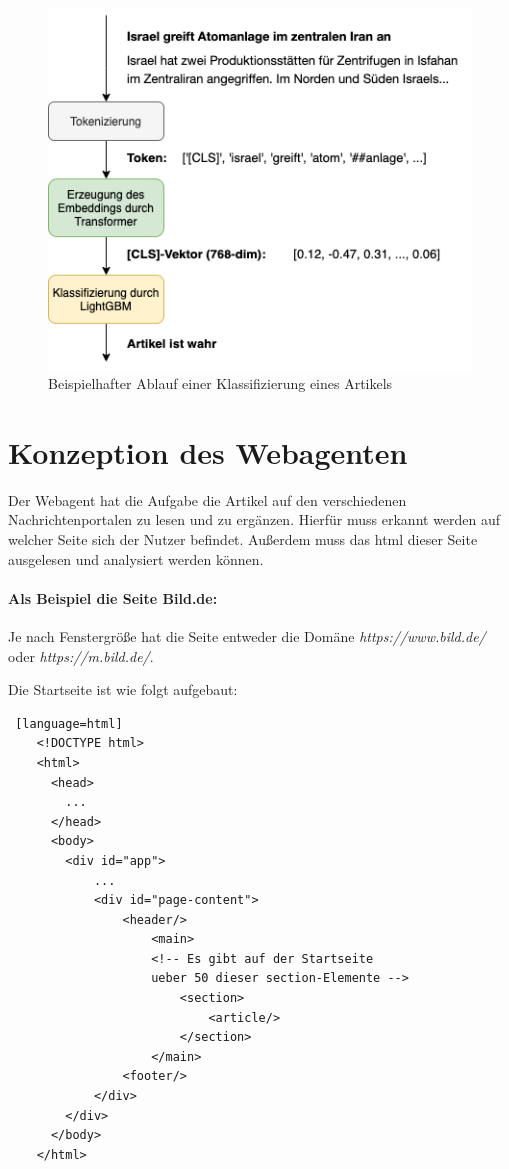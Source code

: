 \begin{figure}[htbp]
    \begin{center}
        \includegraphics[scale=0.6]{diagrams/beispielablauf_gesamt.png}
        \caption{\label{fig:beispielablauf_gesamt} Beispielhafter Ablauf einer Klassifizierung eines Artikels}
    \end{center}
\end{figure}

\section{Konzeption des Webagenten} \label{sec:06:hauptkomponente}

Der Webagent hat die Aufgabe die Artikel auf den verschiedenen Nachrichtenportalen zu lesen und zu ergänzen.
Hierfür muss erkannt werden auf welcher Seite sich der Nutzer befindet. Außerdem muss das html dieser Seite ausgelesen und analysiert werden können.

\paragraph{Als Beispiel die Seite Bild.de:} 
Je nach Fenstergröße hat die Seite entweder die Domäne \textit{https://www.bild.de/} oder \textit{https://m.bild.de/}.

Die Startseite ist wie folgt aufgebaut:

\begin{lstlisting} [language=html]
    <!DOCTYPE html>
    <html>
      <head>
        ...
      </head>
      <body>
        <div id="app">
            ...
            <div id="page-content">
                <header/>
                    <main>
                    <!-- Es gibt auf der Startseite 
                    ueber 50 dieser section-Elemente -->
                        <section>
                            <article/>
                        </section>
                    </main>
                <footer/>
            </div>    
        </div>
      </body>
    </html>
\end{lstlisting}

